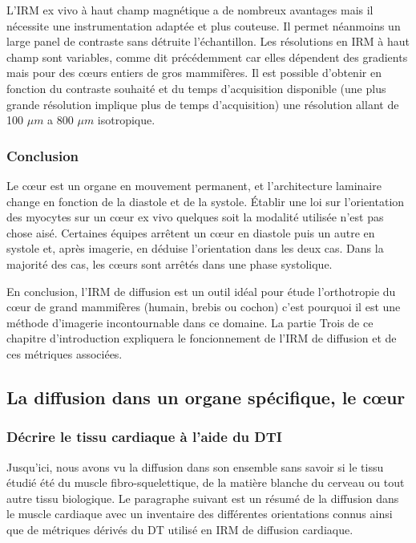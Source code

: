 L’IRM ex vivo à haut champ magnétique a de nombreux avantages mais il nécessite une instrumentation adaptée et plus couteuse. Il permet néanmoins un large panel de contraste sans détruite l’échantillon. Les résolutions en IRM à haut champ sont variables, comme dit précédemment car elles dépendent des gradients mais pour des cœurs entiers de gros mammifères. Il est possible d’obtenir en fonction du contraste souhaité et du temps d’acquisition disponible (une plus grande résolution implique plus de temps d’acquisition) une résolution allant de 100 $\mu m$ a 800 $\mu m$ isotropique.

\subsubsection{Conclusion}

Le cœur est un organe en mouvement permanent, et l’architecture laminaire change en fonction de la diastole et de la systole. Établir une loi sur l’orientation des myocytes sur un cœur ex vivo quelques soit la modalité utilisée n’est pas chose aisé. Certaines équipes\cite{NiellesVallespin2019} \cite{STREETER1969} arrêtent un cœur en diastole puis un autre en systole et, après imagerie, en déduise l’orientation dans les deux cas. Dans la majorité des cas, les cœurs sont arrêtés dans une phase systolique.

En conclusion, l’IRM de diffusion est un outil idéal pour étude l’orthotropie du cœur de grand mammifères (humain, brebis ou cochon) c’est pourquoi il est une méthode d’imagerie incontournable dans ce domaine. La partie Trois de ce chapitre d’introduction expliquera le foncionnement de l’IRM de diffusion et de ces métriques associées.



\subsection{La diffusion dans un organe spécifique, le cœur}

\subsubsection{Décrire le tissu cardiaque à l’aide du DTI}

Jusqu’ici, nous avons vu la diffusion dans son ensemble sans savoir si le tissu étudié été du muscle fibro-squelettique, de la matière blanche du cerveau ou tout autre tissu biologique. Le paragraphe suivant est un résumé de la diffusion dans le muscle cardiaque avec un inventaire des différentes orientations connus ainsi que de métriques dérivés du DT utilisé en IRM de diffusion cardiaque.

